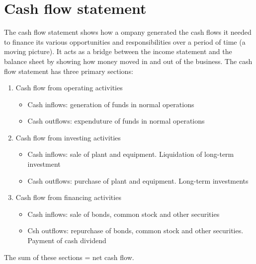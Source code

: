 \section{Cash flow statement}
The cash flow statement shows how a ompany generated the cash flows it needed to finance its various opportunities and responsibilities over a period of time (a moving picture). It acts as a bridge between the income statement and the balance sheet by showing how money moved in and out of the business. The cash flow statement has three primary sections:
\begin{enumerate}
    \item Cash flow from operating activities
    \begin{itemize}
        \item Cash inflows: generation of funds in normal operations
        \item Cash outflows: expenduture of funds in normal operations
    \end{itemize}
    \item Cash flow from investing activities
    \begin{itemize}
        \item Cash inflows: sale of plant and equipment. Liquidation of long-term investment
        \item Cash outflows: purchase of plant and equipment. Long-term investments
    \end{itemize}
    \item Cash flow from financing activities
    \begin{itemize}
        \item Cash inflows: sale of bonds, common stock and other securities
        \item Csh outflows: repurchase of bonds, common stock and other securities. Payment of cash dividend
    \end{itemize}
\end{enumerate}
The sum of these sections = net cash flow.
